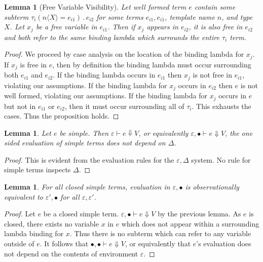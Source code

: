 \documentclass{article}
\newcommand{\la}{\langle}
\newcommand{\ra}{\rangle}
\newcommand{\ve}{\varepsilon}
\newcommand{\de}{\Delta}
\newcommand{\hole}{\bullet}
\newcommand{\st}{\,.\,}
\newcommand{\da}{\Downarrow}
\newcommand{\vd}{\vdash}
\newtheorem{lemma}[theorem]{Lemma}
\begin{document}
\begin{lemma}[Free Variable Visibility]
  \label{visible}
  Let well formed term $e$ contain some subterm $\tau_i (n \la X \ra = e_{i1}) \st e_{i2}$ for some terms $e_{i1}, e_{i1}$, template name $n$, and type $X$. Let $x_j$ be a free variable in $e_{i1}$. Then if $x_j$ appears in $e_{i2}$, it is also free in $e_{i2}$ and both refer to the same binding lambda which surrounds the entire $\tau_i$ term.
\end{lemma}
\begin{proof}
  We proceed by case analysis on the location of the binding lambda for $x_j$. If $x_j$ is free in $e$, then by definition the binding lambda must occur surrounding both $e_{i1}$ and $e_{i2}$. If the binding lambda occurs in $e_{i1}$ then $x_j$ is not free in $e_{i1}$, violating our assumptions. If the binding lambda for $x_j$ occurs in $e_{i2}$ then $e$ is not well formed, violating our assumptions. If the binding lambda for $x_j$ occurs in $e$ but not in $e_{i1}$ or $e_{i2}$, then it must occur surrounding all of $\tau_i$. This exhausts the cases. Thus the proposition holds.
\end{proof}

\begin{lemma}
  Let $e$ be simple. Then $\ve \vd e \da V$, or equivalently $\ve,\hole \vd e \da V$, the one sided evaluation of simple terms does not depend on $\de$.
\end{lemma}
\begin{proof}
  This is evident from the evaluation rules for the $\ve,\de$ system. No rule for simple terms inspects $\de$.
\end{proof}

\begin{lemma}
  For all closed simple terms, evaluation in $\ve,\hole$ is observationally equivalent to $\ve',\hole$ for all $\ve,\ve'$.
\end{lemma}
\begin{proof}
  Let $e$ be a closed simple term. $\ve,\hole \vd e \da V$ by the previous lemma. As $e$ is closed, there exists no variable $x$ in $e$ which does not appear within a surrounding lambda binding for $x$. Thus there is no subterm which can refer to any variable outside of $e$. It follows that $\hole,\hole \vd e \da V$, or equivalently that $e$'s evaluation does not depend on the contents of environment $\ve$.
\end{proof}
\end{document}
